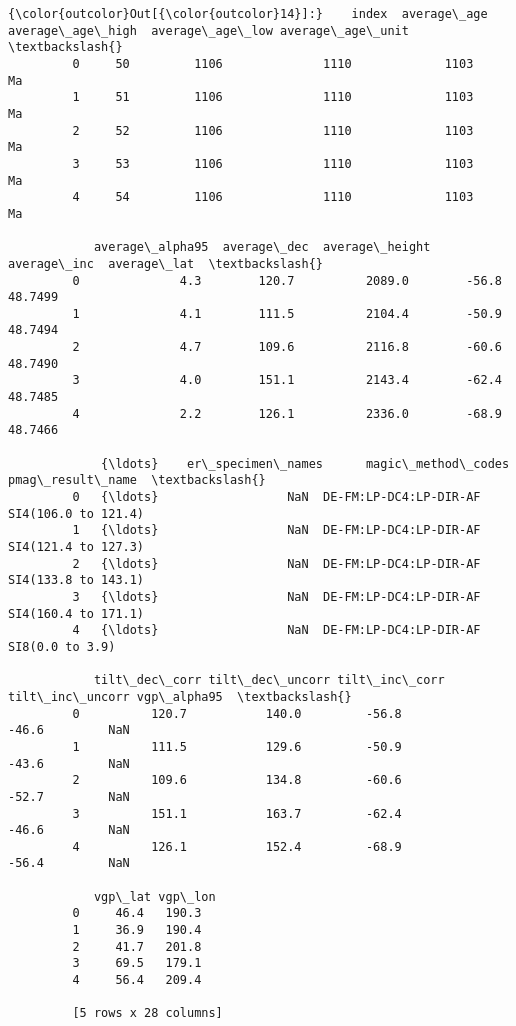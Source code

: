 \documentclass{article}
\begin{document}
            \begin{Verbatim}[commandchars=\\\{\}]
{\color{outcolor}Out[{\color{outcolor}14}]:}    index  average\_age  average\_age\_high  average\_age\_low average\_age\_unit  \textbackslash{}
         0     50         1106              1110             1103               Ma   
         1     51         1106              1110             1103               Ma   
         2     52         1106              1110             1103               Ma   
         3     53         1106              1110             1103               Ma   
         4     54         1106              1110             1103               Ma   
         
            average\_alpha95  average\_dec  average\_height  average\_inc  average\_lat  \textbackslash{}
         0              4.3        120.7          2089.0        -56.8      48.7499   
         1              4.1        111.5          2104.4        -50.9      48.7494   
         2              4.7        109.6          2116.8        -60.6      48.7490   
         3              4.0        151.1          2143.4        -62.4      48.7485   
         4              2.2        126.1          2336.0        -68.9      48.7466   
         
             {\ldots}    er\_specimen\_names      magic\_method\_codes     pmag\_result\_name  \textbackslash{}
         0   {\ldots}                  NaN  DE-FM:LP-DC4:LP-DIR-AF  SI4(106.0 to 121.4)   
         1   {\ldots}                  NaN  DE-FM:LP-DC4:LP-DIR-AF  SI4(121.4 to 127.3)   
         2   {\ldots}                  NaN  DE-FM:LP-DC4:LP-DIR-AF  SI4(133.8 to 143.1)   
         3   {\ldots}                  NaN  DE-FM:LP-DC4:LP-DIR-AF  SI4(160.4 to 171.1)   
         4   {\ldots}                  NaN  DE-FM:LP-DC4:LP-DIR-AF      SI8(0.0 to 3.9)   
         
            tilt\_dec\_corr tilt\_dec\_uncorr tilt\_inc\_corr  tilt\_inc\_uncorr vgp\_alpha95  \textbackslash{}
         0          120.7           140.0         -56.8            -46.6         NaN   
         1          111.5           129.6         -50.9            -43.6         NaN   
         2          109.6           134.8         -60.6            -52.7         NaN   
         3          151.1           163.7         -62.4            -46.6         NaN   
         4          126.1           152.4         -68.9            -56.4         NaN   
         
            vgp\_lat vgp\_lon  
         0     46.4   190.3  
         1     36.9   190.4  
         2     41.7   201.8  
         3     69.5   179.1  
         4     56.4   209.4  
         
         [5 rows x 28 columns]
\end{Verbatim}
        
\end{document}
